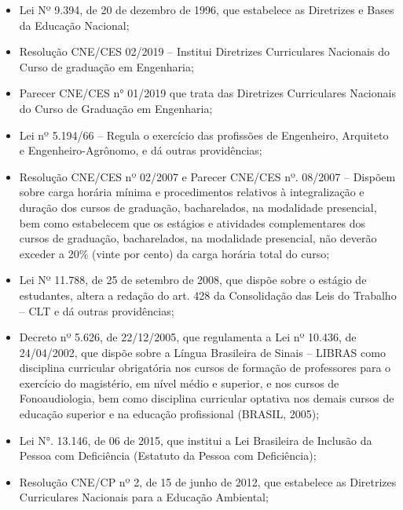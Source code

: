 \begin{itemize}
	\item Lei Nº 9.394, de 20 de dezembro de 1996, que estabelece as Diretrizes e Bases da Educação Nacional;
	
	\item Resolução CNE/CES 02/2019 – Institui Diretrizes Curriculares Nacionais do Curso de graduação em Engenharia;
	
	\item Parecer CNE/CES n° 01/2019 que trata das Diretrizes Curriculares Nacionais do Curso de Graduação em Engenharia;	
	
	\item Lei nº 5.194/66 – Regula o exercício das profissões de Engenheiro, Arquiteto e Engenheiro-Agrônomo, e dá outras providências;
	
	\item Resolução CNE/CES nº 02/2007 e Parecer CNE/CES nº. 08/2007 – Dispõem sobre carga horária mínima e procedimentos relativos à integralização e duração dos cursos de graduação, bacharelados, na modalidade presencial, bem como estabelecem que os estágios e atividades complementares dos cursos de graduação, bacharelados, na modalidade presencial,
	não deverão exceder a 20\% (vinte por cento) da carga horária total do curso;
	
	\item Lei Nº 11.788, de 25 de setembro de 2008, que dispõe sobre o estágio de estudantes, altera a redação do art. 428 da Consolidação das Leis do Trabalho – CLT e dá outras providências;
	
	
	\item Decreto nº 5.626, de 22/12/2005, que regulamenta a Lei nº 10.436, de 24/04/2002, que dispõe sobre a Língua Brasileira de Sinais – LIBRAS como disciplina curricular obrigatória nos cursos de formação de professores para o exercício do magistério, em nível médio e superior, e nos cursos de Fonoaudiologia, bem como disciplina curricular optativa nos
	demais cursos de educação superior e na educação profissional (BRASIL, 2005);
	
	\item Lei N°. 13.146, de 06 de 2015, que institui a Lei Brasileira de Inclusão da Pessoa com Deficiência (Estatuto da Pessoa com Deficiência);
	
	\item  Resolução CNE/CP nº 2, de 15 de junho de 2012, que estabelece as Diretrizes Curriculares Nacionais para a Educação Ambiental;
	

\end{itemize}
